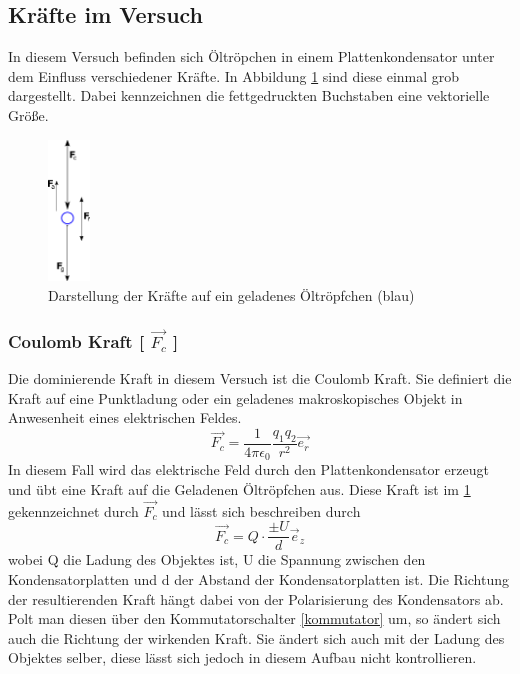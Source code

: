 \documentclass{scrartcl}
\begin{document}
	\subsection{Kräfte im Versuch}
		In diesem Versuch befinden sich Öltröpchen in einem Plattenkondensator unter dem Einfluss verschiedener Kräfte.
		In Abbildung \ref{forces} sind diese einmal grob dargestellt. Dabei kennzeichnen die fettgedruckten Buchstaben eine
		vektorielle Größe.
		\begin{figure}[H]
			\centering
			\includegraphics[width=0.1\textwidth]{kräfte.png} 
			\caption{Darstellung der Kräfte auf ein geladenes Öltröpfchen (blau)}
			\label{forces}
		\end{figure}

		\subsubsection{Coulomb Kraft [ $\vec{F_c}$ ]}
			Die dominierende Kraft in diesem Versuch ist die Coulomb Kraft. Sie definiert die Kraft auf eine Punktladung oder ein
			geladenes makroskopisches Objekt in Anwesenheit eines elektrischen Feldes.
            \begin{equation}
                \vec{F_c} = \frac{1}{4\pi \epsilon_0}\frac{q_1 q_2}{r^2}\vec{e_r}
            \end{equation}
            In diesem Fall wird das elektrische Feld
			durch den Plattenkondensator erzeugt und übt eine Kraft auf die Geladenen Öltröpfchen aus. Diese Kraft ist im \ref{forces}
			gekennzeichnet durch $\vec{F_c}$ und lässt sich beschreiben durch
			\begin{equation}
				\vec{F_c} = Q \cdot \frac{\pm U}{d} \vec{e}_z
			\end{equation}
			wobei Q die Ladung des Objektes ist, U die Spannung zwischen den Kondensatorplatten und d der Abstand der Kondensatorplatten ist.
			Die Richtung der resultierenden Kraft hängt dabei von der Polarisierung des Kondensators ab. Polt man diesen über den Kommutatorschalter \ref{kommutator}
			um, so ändert sich auch die Richtung der wirkenden Kraft. Sie ändert sich auch mit der Ladung des Objektes selber,
			diese lässt sich jedoch in diesem Aufbau nicht kontrollieren.	
		
\end{document}
